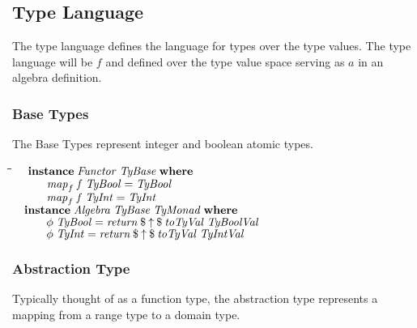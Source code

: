 \documentclass[10pt]{article}
\newlength{\lwidth}\setlength{\lwidth}{4.5cm}
\newlength{\cwidth}\setlength{\cwidth}{8mm} %
\newcommand{\Conid}[1]{\mathit{#1}}
\newcommand{\Varid}[1]{\mathit{#1}}
\begin{document}
\subsection{Type Language}

The type language defines the language for types over the type values.
The type language will be \ensuremath{\Varid{f}} and defined over the type value space
serving as \ensuremath{\Varid{a}} in an algebra definition.

\subsubsection{Base Types}

The Base Types represent integer and boolean atomic types.

\begin{tabbing}
\qquad\=\hspace{\lwidth}\=\hspace{\cwidth}\=\+\kill
${\hskip1.00em\relax\mathbf{instance}\;\Conid{Functor}\;\Conid{TyBase}\;\mathbf{where}}$\\
${\hskip1.00em\relax\hskip2.00em\relax\Varid{map}_{f}\;\Varid{f}\;\Conid{TyBool}\mathrel{=}\Conid{TyBool}}$\\
${\hskip1.00em\relax\hskip2.00em\relax\Varid{map}_{f}\;\Varid{f}\;\Conid{TyInt}\mathrel{=}\Conid{TyInt}}$\\
${}$\\
${\hskip1.00em\relax\mathbf{instance}\;\Conid{Algebra}\;\Conid{TyBase}\;\Conid{TyMonad}\;\mathbf{where}}$\\
${\hskip1.00em\relax\hskip2.00em\relax\Varid{\phi}\;\Conid{TyBool}\mathrel{=}\Varid{return}\mathbin{\$}\Varid{\uparrow}\mathbin{\$}\Varid{toTyVal}\;\Conid{TyBoolVal}}$\\
${\hskip1.00em\relax\hskip2.00em\relax\Varid{\phi}\;\Conid{TyInt}\mathrel{=}\Varid{return}\mathbin{\$}\Varid{\uparrow}\mathbin{\$}\Varid{toTyVal}\;\Conid{TyIntVal}}$
\end{tabbing}
\subsubsection{Abstraction Type}

Typically thought of as a function type, the abstraction type
represents a mapping from a range type to a domain type.
\end{document}

